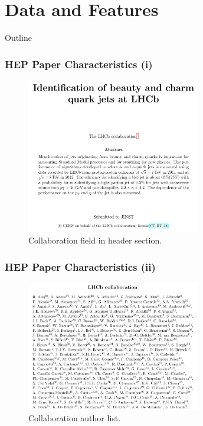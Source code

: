 \documentclass{beamer}
\begin{document}

\section{Data and Features}


\begin{frame}[noframenumbering]{Outline}
\end{frame}


\begin{frame}
\frametitle{HEP Paper Characteristics (i)}
\begin{figure}[h]
\center
\includegraphics[width=3in]{Figures/collaboration.pdf}
\caption{Collaboration field in header section.}
\end{figure}
\end{frame}


\begin{frame}
\frametitle{HEP Paper Characteristics (ii)}
\begin{figure}[h]
\center
\includegraphics[width=3in]{Figures/authors.pdf}
\caption{Collaboration author list.}
\end{figure}
\end{frame}
\end{document}
